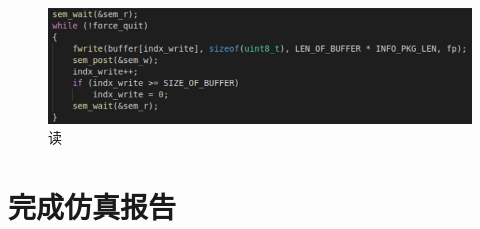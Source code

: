 \documentclass{article}
\begin{document}
\begin{figure}[H]
	\centering
	\includegraphics[width = .6\textwidth]{read.png}
	\caption{读}
\end{figure}

\section{完成仿真报告}



\end{document}
